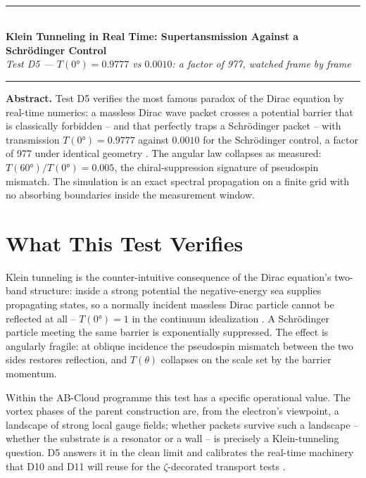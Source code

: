 \documentclass[11pt,a4paper]{article}
\begin{document}
\\[0.3em]
\rule{\textwidth}{0.8pt}\\[0.6em]
{\LARGE\bfseries\color{labblue} Klein Tunneling in Real Time: Supertansmission Against a Schrödinger Control}\\[0.5em]
{\normalsize\itshape Test D5 — $T(0°) = 0.9777$ vs $0.0010$: a factor of 977, watched frame by frame}\\[0.4em]
\rule{\textwidth}{0.4pt}

\begin{tcolorbox}[colback=labgreen!8, colframe=labgreen!70!black, title={Verdict: PASS — 4/4 checks}, fonttitle=\bfseries, boxrule=0.6pt]
\textbf{Abstract.} Test D5 verifies the most famous paradox of the Dirac equation by real-time numerics: a massless Dirac wave packet crosses a potential barrier that is classically forbidden -- and that perfectly traps a Schrödinger packet -- with transmission $T(0°) = 0.9777$ against $0.0010$ for the Schrödinger control, a factor of 977 under identical geometry \cite{klein}. The angular law collapses as measured: $T(60°)/T(0°) = 0.005$, the chiral-suppression signature of pseudospin mismatch. The simulation is an exact spectral propagation on a finite grid with no absorbing boundaries inside the measurement window.
\end{tcolorbox}

\section{What This Test Verifies}
Klein tunneling is the counter-intuitive consequence of the Dirac equation's two-band structure: inside a strong potential the negative-energy sea supplies propagating states, so a normally incident massless Dirac particle cannot be reflected at all -- $T(0°) = 1$ in the continuum idealization \cite{klein,dirac}. A Schrödinger particle meeting the same barrier is exponentially suppressed. The effect is angularly fragile: at oblique incidence the pseudospin mismatch between the two sides restores reflection, and $T(\theta)$ collapses on the scale set by the barrier momentum.

Within the AB-Cloud programme this test has a specific operational value. The vortex phases of the parent construction are, from the electron's viewpoint, a landscape of strong local gauge fields; whether packets survive such a landscape -- whether the substrate is a resonator or a wall -- is precisely a Klein-tunneling question. D5 answers it in the clean limit and calibrates the real-time machinery that D10 and D11 will reuse for the $\zeta$-decorated transport tests \cite{parent}.
\end{document}
